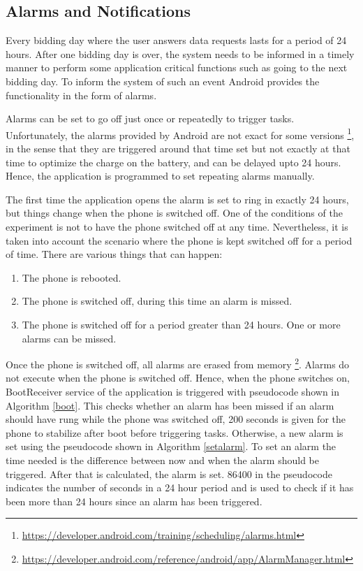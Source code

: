 \subsection{Alarms and Notifications}

Every bidding day where the user answers data requests lasts for a period of 24 hours. After one bidding day is over, the system needs to be informed in a timely manner to perform some application critical functions such as going to the next bidding day. To inform the system of such an event Android provides the functionality in the form of alarms. 

Alarms can be set to go off just once or repeatedly to trigger tasks. Unfortunately, the alarms provided by Android are not exact for some versions \footnote{\url{https://developer.android.com/training/scheduling/alarms.html}}, in the sense that they are triggered around that time set but not exactly at that time to optimize the charge on the battery, and can be delayed upto 24 hours. Hence, the application is programmed to set repeating alarms manually. 

The first time the application opens the alarm is set to ring in exactly 24 hours, but things change when the phone is switched off.
One of the conditions of the experiment is not to have the phone switched off at any time. Nevertheless, it is taken into account the scenario where
the phone is kept switched off for a period of time. There are various things that can happen:

\begin{enumerate}
	\item The phone is rebooted.
	\item The phone is switched off, during this time an alarm is missed.
    \item The phone is switched off for a period greater than 24 hours. One or more alarms can be missed.
\end{enumerate}

Once the phone is switched off, all alarms are erased from memory \footnote{\url{https://developer.android.com/reference/android/app/AlarmManager.html}}. Alarms do not execute when the phone is switched off. Hence, when the phone switches on,
BootReceiver service of the application is triggered with pseudocode shown in Algorithm \ref{boot}. This checks whether an alarm has been missed if an alarm should have rung while the phone was switched off, 200 seconds is given for the phone to stabilize after boot before triggering tasks. Otherwise, a new alarm is set using the pseudocode shown in Algorithm \ref{setalarm}. To set an alarm the time needed is the difference between now and when the alarm should be triggered. After that is calculated, the alarm is set. 86400 in the pseudocode indicates the number of seconds in a 24 hour period and is used to check if it has been more than 24 hours since an alarm has been triggered.


